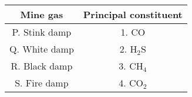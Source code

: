\begin{center}
\begin{tabular}[12pt]{ |c|c| }
    \hline
    \textbf{Mine gas} & \textbf{Principal constituent} \\
    \hline
    P. Stink damp & 1. CO \\
    \hline
    Q. White damp & 2. H$_2$S \\
    \hline
    R. Black damp & 3. CH$_4$ \\
    \hline
    S. Fire damp & 4. CO$_2$ \\
    \hline
\end{tabular}
\end{center}
